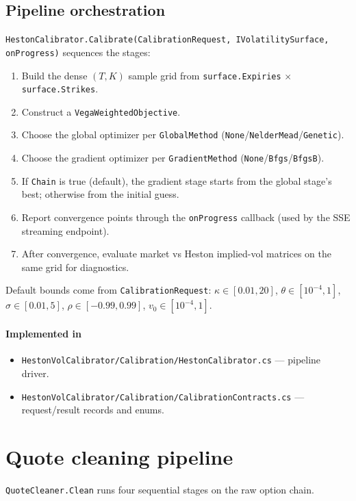 \documentclass[11pt,a4paper]{article}
\begin{document}
\subsection{Pipeline orchestration}
\texttt{HestonCalibrator.Calibrate(CalibrationRequest, IVolatilitySurface, onProgress)}
sequences the stages:
\begin{enumerate}
\item Build the dense $(T, K)$ sample grid from \texttt{surface.Expiries} $\times$ \texttt{surface.Strikes}.
\item Construct a \texttt{VegaWeightedObjective}.
\item Choose the global optimizer per \texttt{GlobalMethod} (\texttt{None}/\texttt{NelderMead}/\texttt{Genetic}).
\item Choose the gradient optimizer per \texttt{GradientMethod} (\texttt{None}/\texttt{Bfgs}/\texttt{BfgsB}).
\item If \texttt{Chain} is true (default), the gradient stage starts from the global stage's best;
otherwise from the initial guess.
\item Report convergence points through the \texttt{onProgress} callback (used by the SSE streaming endpoint).
\item After convergence, evaluate market vs Heston implied-vol matrices on the same grid for diagnostics.
\end{enumerate}
Default bounds come from \texttt{CalibrationRequest}:
$\kappa \in [0.01, 20]$, $\theta \in [10^{-4}, 1]$, $\sigma \in [0.01, 5]$,
$\rho \in [-0.99, 0.99]$, $v_0 \in [10^{-4}, 1]$.

\paragraph*{Implemented in}
\begin{itemize}
\item \texttt{HestonVolCalibrator/Calibration/HestonCalibrator.cs} --- pipeline driver.
\item \texttt{HestonVolCalibrator/Calibration/CalibrationContracts.cs} --- request/result records and enums.
\end{itemize}

\section{Quote cleaning pipeline}
\label{sec:cleaner}
\texttt{QuoteCleaner.Clean} runs four sequential stages on the raw option chain.
\end{document}
